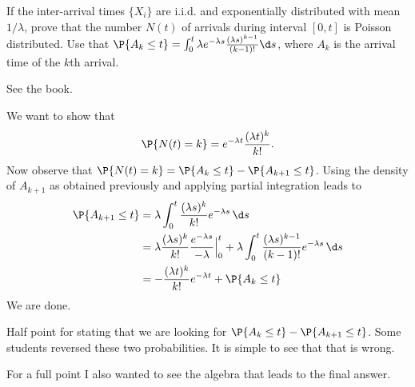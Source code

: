 \begin{exercise}[201706]
 If the inter-arrival times $\{X_i\}$ are i.i.d. and exponentially
 distributed with mean $1/\lambda$, prove that the number $N(t)$ of
 arrivals during interval $[0,t]$ is Poisson distributed.
Use that $\P{A_{k} \leq t} = \int_0^t \lambda e^{-\lambda s} \frac{(\lambda s)^{k-1}}{(k-1)!} \d s$, where $A_k$ is the arrival time of the $k$th arrival.
\begin{solution}
See the book.

 We want to show that
 \begin{equation*}
 \P{N(t)=k} = e^{-\lambda t}\frac{(\lambda t)^k}{k!}.
 \end{equation*}
 Now observe that
 $\P{N(t)=k} = \P{A_k \leq t} - \P{A_{k+1} \leq t}$. Using the
 density of $A_{k+1}$ as obtained previously and applying partial
 integration leads to
\begin{equation*}
 \begin{split}
\P{A_{k+1} \leq t} 
&= \lambda \int_0^t \frac{(\lambda s)^{k}}{k!}e^{-\lambda s}\, \d s \\
&= \lambda \frac{(\lambda s)^{k}}{k!}\frac{e^{-\lambda s}}{-\lambda} \Big|_{0}^t + \lambda \int_0^t \frac{(\lambda s)^{k-1}}{(k-1)!}e^{-\lambda s}\, \d s \\
&= - \frac{(\lambda t)^{k}}{k!} e^{-\lambda t} + \P{A_k \leq t}
 \end{split}
\end{equation*}
We are done.

Half point for stating that we are looking for $\P{A_k\leq t} - \P{A_{k+1}\leq t}$. Some students reversed these two probabilities. It is simple to see that that is wrong.

For a full point I also wanted to see the algebra that leads to the final answer. 
\end{solution}
\end{exercise}

